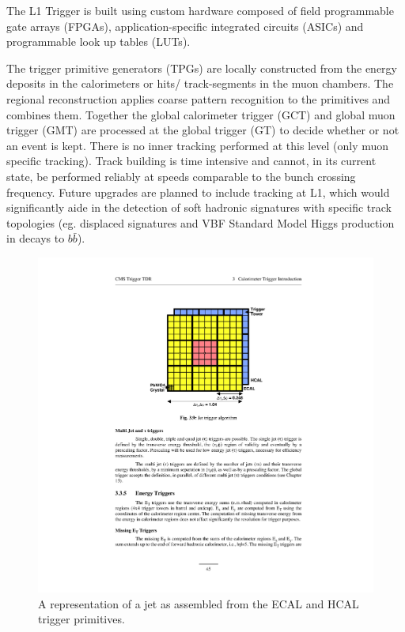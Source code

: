 The L1 Trigger is built using custom hardware composed of field programmable gate arrays (FPGAs), 
application-specific integrated circuits (ASICs) and programmable look up tables (LUTs). 

The trigger primitive generators (TPGs) are locally constructed from the energy deposits in the calorimeters or
hits/ track-segments in the muon chambers. The regional reconstruction applies coarse pattern
 recognition to the primitives and combines them. Together the  global calorimeter trigger (GCT)
 and global muon trigger (GMT) are processed at the global trigger (GT) to decide whether or
 not an event is kept. There is no inner tracking performed at this
 level (only muon specific tracking). Track building is time intensive and cannot, in its current
 state, be performed reliably at speeds comparable to the bunch crossing frequency. 
 Future upgrades are planned to include tracking at L1, which would significantly aide in
 the detection of soft hadronic signatures with specific track topologies (eg. displaced signatures 
 and VBF Standard Model Higgs production in decays to $b\bar{b}$). 

\begin{figure}
\begin{center}
\includegraphics[width=.55\textwidth]{pics/jet_trigger_tower}
\caption{A  representation of a jet as assembled from the ECAL and HCAL trigger primitives. \cite{tridastdr}}
\end{center}
\label{fig:jet_trigger_tower}
\end{figure}

